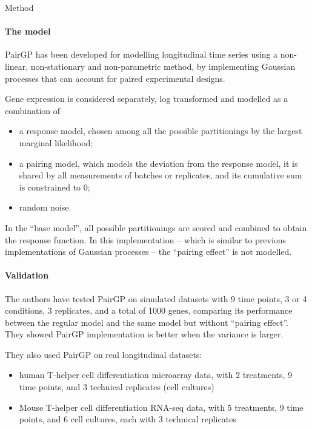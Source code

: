 \documentclass[10pt,a4paper]{article}
\newlength{\templength}
\newenvironment{ann_section}[1]
{\settowidth{\templength}{#1}%
\noindent\textbf{#1}
\hspace{1em}\begin{minipage}[t]{\dimexpr \linewidth-\the\templength-2em}}
{\end{minipage}\par\bigskip}
\begin{document}
\begin{ann_section}{Method}
\paragraph{The model} PairGP has been developed for modelling longitudinal time series using a non-linear, non-stationary and non-parametric method, by implementing Gaussian processes that can account for paired experimental designs.

Gene expression is considered separately, log transformed and modelled as a combination of
\begin{itemize}
    \item a response model, chosen among all the possible partitionings by the largest marginal likelihood;
    \item a pairing model, which models the deviation from the response model, it is shared by all measurements of batches or replicates, and its cumulative sum is constrained to 0;
    \item random noise.
\end{itemize}

In the ``base model'', all possible partitionings are scored and combined to obtain the response function. In this implementation -- which is similar to previous implementations of Gaussian processes -- the ``pairing effect'' is not modelled.

\paragraph{Validation} The authors have tested PairGP on simulated datasets with 9 time points, 3 or 4 conditions, 3 replicates, and a total of 1000 genes, comparing its performance between the regular model and the same model but without ``pairing effect''. They showed PairGP implementation is better when the variance is larger.

They also used PairGP on real longitudinal datasets:
\begin{itemize}
    \item human T-helper cell differentiation microarray data, with 2 treatments, 9 time points, and 3 technical replicates (cell cultures)
    \item Mouse T-helper cell differentiation RNA-seq data, with 5 treatments, 9 time points, and 6 cell cultures, each with 3 technical replicates
\end{itemize}
\end{ann_section}
\end{document}
